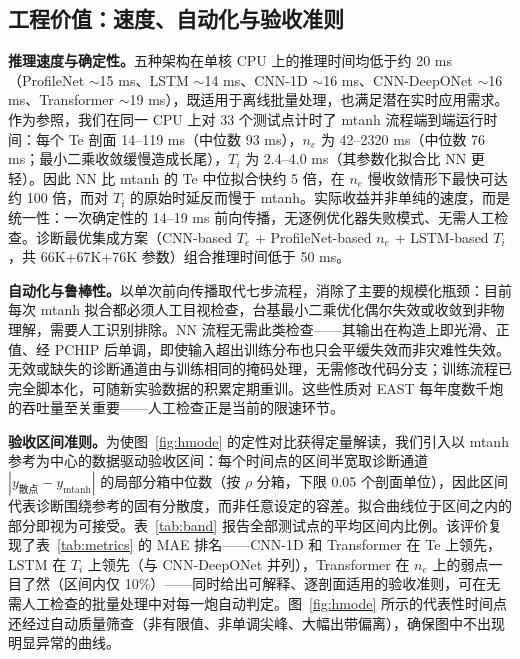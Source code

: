 \documentclass[a4paper,12pt]{ctexart}
\begin{document}
\subsection{工程价值：速度、自动化与验收准则}

\textbf{推理速度与确定性。}五种架构在单核 CPU 上的推理时间均低于约 20 ms（ProfileNet $\sim$15 ms、LSTM $\sim$14 ms、CNN-1D $\sim$16 ms、CNN-DeepONet $\sim$16 ms、Transformer $\sim$19 ms），既适用于离线批量处理，也满足潜在实时应用需求。作为参照，我们在同一 CPU 上对 33 个测试点计时了 mtanh 流程端到端运行时间：每个 Te 剖面 14--119 ms（中位数 93 ms），$n_e$ 为 42--2320 ms（中位数 76 ms；最小二乘收敛缓慢造成长尾），$T_i$ 为 2.4--4.0 ms（其参数化拟合比 NN 更轻）。因此 NN 比 mtanh 的 Te 中位拟合快约 5 倍，在 $n_e$ 慢收敛情形下最快可达约 100 倍，而对 $T_i$ 的原始时延反而慢于 mtanh。实际收益并非单纯的速度，而是统一性：一次确定性的 14--19 ms 前向传播，无逐例优化器失败模式、无需人工检查。诊断最优集成方案（CNN-based $T_e$ + ProfileNet-based $n_e$ + LSTM-based $T_i$，共 66K+67K+76K 参数）组合推理时间低于 50 ms。

\textbf{自动化与鲁棒性。}以单次前向传播取代七步流程，消除了主要的规模化瓶颈：目前每次 mtanh 拟合都必须人工目视检查，台基最小二乘优化偶尔失效或收敛到非物理解，需要人工识别排除。NN 流程无需此类检查——其输出在构造上即光滑、正值、经 PCHIP 后单调，即使输入超出训练分布也只会平缓失效而非灾难性失效。无效或缺失的诊断通道由与训练相同的掩码处理，无需修改代码分支；训练流程已完全脚本化，可随新实验数据的积累定期重训。这些性质对 EAST 每年度数千炮的吞吐量至关重要——人工检查正是当前的限速环节。

\textbf{验收区间准则。}为使图~\ref{fig:hmode} 的定性对比获得定量解读，我们引入以 mtanh 参考为中心的数据驱动验收区间：每个时间点的区间半宽取诊断通道 $|y_{\text{散点}} - y_{\text{mtanh}}|$ 的局部分箱中位数（按 $\rho$ 分箱，下限 0.05 个剖面单位），因此区间代表诊断围绕参考的固有分散度，而非任意设定的容差。拟合曲线位于区间之内的部分即视为可接受。表~\ref{tab:band} 报告全部测试点的平均区间内比例。该评价复现了表~\ref{tab:metrics} 的 MAE 排名——CNN-1D 和 Transformer 在 Te 上领先，LSTM 在 $T_i$ 上领先（与 CNN-DeepONet 并列），Transformer 在 $n_e$ 上的弱点一目了然（区间内仅 10\%）——同时给出可解释、逐剖面适用的验收准则，可在无需人工检查的批量处理中对每一炮自动判定。图~\ref{fig:hmode} 所示的代表性时间点还经过自动质量筛查（非有限值、非单调尖峰、大幅出带偏离），确保图中不出现明显异常的曲线。
\end{document}
